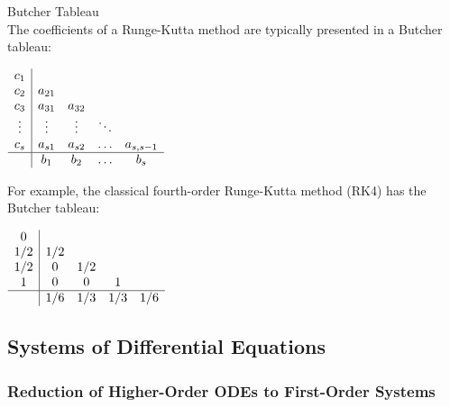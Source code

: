 \begin{concept}{Butcher Tableau}\\
The coefficients of a Runge-Kutta method are typically presented in a Butcher tableau:
\begin{center}
$\begin{array}{c|cccc}
c_1 & & & & \\
c_2 & a_{21} & & & \\
c_3 & a_{31} & a_{32} & & \\
\vdots & \vdots & \vdots & \ddots & \\
c_s & a_{s1} & a_{s2} & \ldots & a_{s,s-1} \\
\hline
& b_1 & b_2 & \ldots & b_s
\end{array}$
\end{center}

For example, the classical fourth-order Runge-Kutta method (RK4) has the Butcher tableau:
\begin{center}
$\begin{array}{c|cccc}
0 & & & & \\
1/2 & 1/2 & & & \\
1/2 & 0 & 1/2 & & \\
1 & 0 & 0 & 1 & \\
\hline
& 1/6 & 1/3 & 1/3 & 1/6
\end{array}$
\end{center}
\end{concept}

\subsection{Systems of Differential Equations}

\subsubsection{Reduction of Higher-Order ODEs to First-Order Systems}

